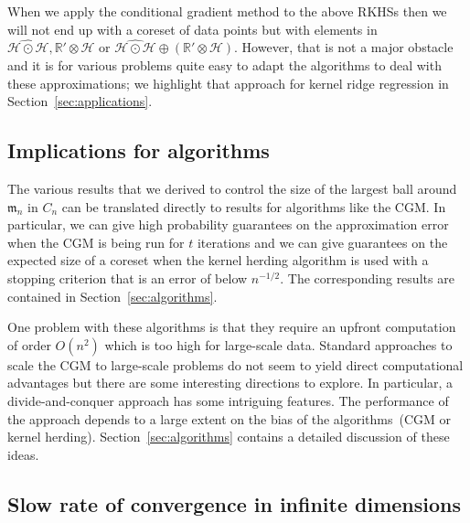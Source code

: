 \documentclass[AHL,Unicode,longabstracts,published]{cedram}
\theoremstyle{remark}
\newcommand{\R}{\mathbb{R}}
\newcommand{\dR}{{\R'}}
\newcommand{\cH}{\mathcal{H}}
\newcommand{\mean}{\mathfrak{m}}
\begin{document}
When we apply the conditional gradient method to the above RKHSs then we will not end up with a coreset of data points but with elements in $\widehat{\cH \odot \cH}, \dR \otimes \cH$ or $\widehat{\cH \odot \cH} \oplus (\dR \otimes \cH)$. However, that is not a major obstacle and it is for various problems quite easy to adapt the algorithms to deal with these approximations; we highlight that approach for kernel ridge regression in Section~\ref{sec:applications}.



\subsection{Implications for algorithms}

The various results that we derived to control the size of the largest ball around $\mean_n$ in $C_n$ can be translated directly to results for algorithms like the CGM. In particular, we can give high probability guarantees on the approximation error when the CGM is being run for $t$ iterations and we can give guarantees on the expected size of a coreset when the kernel herding algorithm is used with a stopping criterion that is an error of below $n^{-1/2}$. The corresponding results are contained in Section~\ref{sec:algorithms}.



One problem with these algorithms is that they require an upfront computation of order $O(n^2)$ which is too high for large-scale data. Standard approaches to scale the CGM to large-scale problems do not seem to yield direct computational advantages but there are some interesting directions to explore. In particular, a divide-and-conquer approach has some intriguing features. The performance of the approach depends to a large extent on the bias of the algorithms~(CGM or kernel herding). Section~\ref{sec:algorithms} contains a detailed discussion of these ideas.



\subsection{Slow rate of convergence in infinite dimensions}
\end{document}
